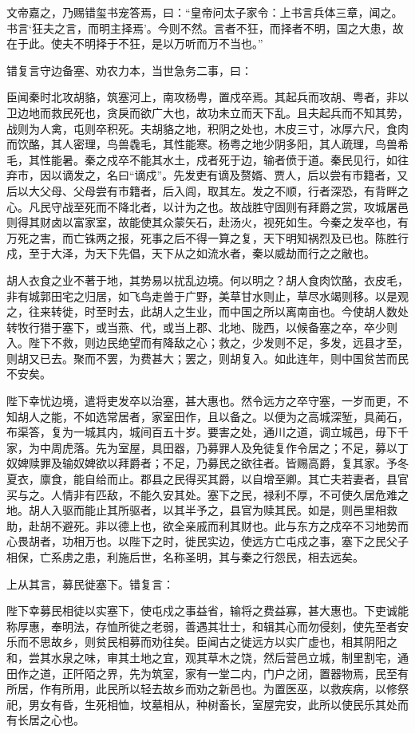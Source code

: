 \documentclass[]{article}
\begin{document}
文帝嘉之，乃赐错玺书宠答焉，曰：``皇帝问太子家令：上书言兵体三章，闻之。书言`狂夫之言，而明主择焉'。今则不然。言者不狂，而择者不明，国之大患，故在于此。使夫不明择于不狂，是以万听而万不当也。''

错复言守边备塞、劝农力本，当世急务二事，曰：

臣闻秦时北攻胡貉，筑塞河上，南攻杨粤，置戍卒焉。其起兵而攻胡、粤者，非以卫边地而救民死也，贪戾而欲广大也，故功未立而天下乱。且夫起兵而不知其势，战则为人禽，屯则卒积死。夫胡貉之地，积阴之处也，木皮三寸，冰厚六尺，食肉而饮酪，其人密理，鸟兽毳毛，其性能寒。杨粤之地少阴多阳，其人疏理，鸟兽希毛，其性能暑。秦之戍卒不能其水土，戍者死于边，输者偾于道。秦民见行，如往弃市，因以谪发之，名曰``谪戍''。先发吏有谪及赘婿、贾人，后以尝有市籍者，又后以大父母、父母尝有市籍者，后入闾，取其左。发之不顺，行者深恐，有背畔之心。凡民守战至死而不降北者，以计为之也。故战胜守固则有拜爵之赏，攻城屠邑则得其财卤以富家室，故能使其众蒙矢石，赴汤火，视死如生。今秦之发卒也，有万死之害，而亡铢两之报，死事之后不得一算之复，天下明知祸烈及已也。陈胜行戍，至于大泽，为天下先倡，天下从之如流水者，秦以威劫而行之之敝也。

胡人衣食之业不著于地，其势易以扰乱边境。何以明之？胡人食肉饮酪，衣皮毛，非有城郭田宅之归居，如飞鸟走兽于广野，美草甘水则止，草尽水竭则移。以是观之，往来转徙，时至时去，此胡人之生业，而中国之所以离南亩也。今使胡人数处转牧行猎于塞下，或当燕、代，或当上郡、北地、陇西，以候备塞之卒，卒少则入。陛下不救，则边民绝望而有降敌之心；救之，少发则不足，多发，远县才至，则胡又已去。聚而不罢，为费甚大；罢之，则胡复入。如此连年，则中国贫苦而民不安矣。

陛下幸忧边境，遣将吏发卒以治塞，甚大惠也。然令远方之卒守塞，一岁而更，不知胡人之能，不如选常居者，家室田作，且以备之。以便为之高城深堑，具蔺石，布渠答，复为一城其内，城间百五十岁。要害之处，通川之道，调立城邑，毋下千家，为中周虎落。先为室屋，具田器，乃募罪人及免徒复作令居之；不足，募以丁奴婢赎罪及输奴婢欲以拜爵者；不足，乃募民之欲往者。皆赐高爵，复其家。予冬夏衣，廪食，能自给而止。郡县之民得买其爵，以自增至卿。其亡夫若妻者，县官买与之。人情非有匹敌，不能久安其处。塞下之民，禄利不厚，不可使久居危难之地。胡人入驱而能止其所驱者，以其半予之，县官为赎其民。如是，则邑里相救助，赴胡不避死。非以德上也，欲全亲戚而利其财也。此与东方之戍卒不习地势而心畏胡者，功相万也。以陛下之时，徙民实边，使远方亡屯戍之事，塞下之民父子相保，亡系虏之患，利施后世，名称圣明，其与秦之行怨民，相去远矣。

上从其言，募民徙塞下。错复言：

陛下幸募民相徒以实塞下，使屯戍之事益省，输将之费益寡，甚大惠也。下吏诚能称厚惠，奉明法，存恤所徙之老弱，善遇其壮士，和辑其心而勿侵刻，使先至者安乐而不思故乡，则贫民相募而劝往矣。臣闻古之徙远方以实广虚也，相其阴阳之和，尝其水泉之味，审其土地之宜，观其草木之饶，然后营邑立城，制里割宅，通田作之道，正阡陌之界，先为筑室，家有一堂二内，门户之闭，置器物焉，民至有所居，作有所用，此民所以轻去故乡而劝之新邑也。为置医巫，以救疾病，以修祭祀，男女有昏，生死相恤，坟墓相从，种树畜长，室屋完安，此所以使民乐其处而有长居之心也。
\end{document}
